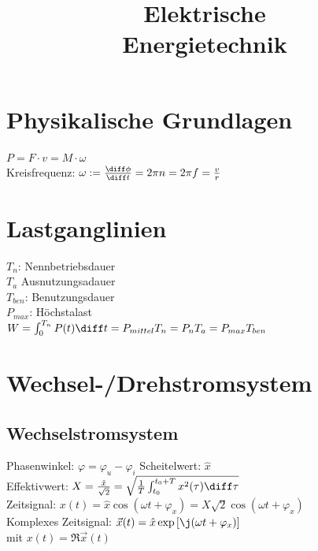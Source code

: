 \documentclass[european]{latex4ei_sheet}
\title{Elektrische \\ Energietechnik}
\begin{document}
\ifdefined\GitRevision{}\fi

\maketitle


	\section{Physikalische Grundlagen}
	$P = F \cdot v = M \cdot \omega$ \\
	Kreisfrequenz: $\omega := \frac{\diff \phi}{\diff t} = 2 \pi n = 2 \pi f = \frac{v}{r}$ \\
	\section{Lastganglinien}
	$T_n$: Nennbetriebsdauer\\
	$T_a$ Ausnutzungsadauer\\
	$T_{ben}$: Benutzungsdauer\\
	$P_{max}$: Höchstalast\\
	$W = \int_0^{T_n} P(t) \diff t = P_{mittel} T_n = P_n T_a = P_{max} T_{ben}$\\
	\section{Wechsel-/Drehstromsystem}
		\subsection{Wechselstromsystem}
		Phasenwinkel: $\varphi = \varphi_u - \varphi_i$ \qquad Scheitelwert: $\hat x$\\
		Effektivwert: $X=\frac{\hat x}{\sqrt{2}} = \sqrt{\frac{1}{T} \int_{t_0}^{t_0 + T} x^2(\tau) \diff \tau}$\\
		Zeitsignal: $x(t) = \hat x \cos(\omega t + \varphi_x) = X \sqrt{2} \cos(\omega t + \varphi_x)$\\
		Komplexes Zeitsignal: $\vec x(t) = \hat x \exp\left[\j (\omega t + \varphi_x)\right]$\\ 
		mit \qquad \qquad $x(t) = \Re{\vec x(t)}$
\end{document}
